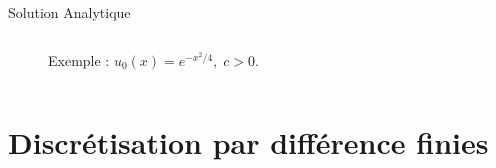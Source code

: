 \documentclass[aspectratio=169, french]{beamer}
\begin{document}
\begin{frame}{Solution Analytique}
\begin{columns}
\begin{column}{.42\textwidth}
\begin{overlayarea}{\textwidth}{\textheight}
\begin{figure}[t]
{				\caption*{Exemple : $u_0(x) = e^{-x^2/4}, \; c>0$.}
			}
		\end{figure}
		\end{overlayarea}
	\end{column}
\end{columns}


\end{frame}

\section{Discrétisation par différence finies}
\end{document}
